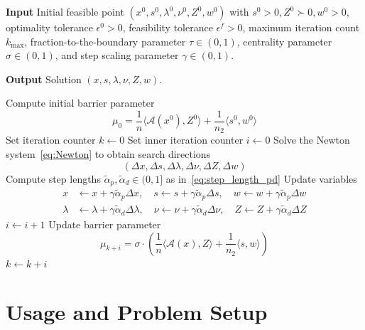 \documentclass[]{interact}
\theoremstyle{plain}%
\theoremstyle{definition}
\theoremstyle{remark}
\begin{document}
\begin{algorithm}[h]
\caption{Outline of the Primal-Dual interior point Method}
\label{algo:pdipm}
\textbf{Input} Initial feasible point \( (x^0, s^0, \lambda^0, \nu^0, Z^0, w^0) \) with \( s^0 > 0, Z^0 \succ 0, w^0 > 0 \), optimality tolerance \(\epsilon^0 > 0\), feasibility tolerance \(\epsilon^f > 0\), maximum iteration count \(k_{\max}\), fraction-to-the-boundary parameter \(\tau \in (0,1)\), centrality parameter \(\sigma \in (0,1)\), and step scaling parameter \(\gamma \in (0,1)\).

\textbf{Output} Solution \( (x, s, \lambda, \nu, Z, w) \).

\begin{algorithmic}[1]
\State Compute initial barrier parameter
\[
\mu_0 = \frac{1}{n} \langle \mathcal{A}(x^0), Z^0 \rangle + \frac{1}{n_2} \langle s^0, w^0 \rangle
\]
\State Set iteration counter \( k \gets 0 \)
    \State Set inner iteration counter \( i \gets 0 \)
        \State Solve the Newton system~\eqref{eq:Newton} to obtain search directions
        \[
        (\Delta x, \Delta s, \Delta \lambda, \Delta \nu, \Delta Z, \Delta w)
        \]
        \State Compute step lengths \( \tilde{\alpha}_p, \tilde{\alpha}_d \in (0,1] \) as in~\eqref{eq:step_length_pd}
        \State Update variables
        \begin{align*}
            x &\gets x + \gamma \tilde{\alpha}_p \Delta x, \quad s \gets s + \gamma \tilde{\alpha}_p \Delta s, \quad w \gets w + \gamma \tilde{\alpha}_p \Delta w \\[6pt]
            \lambda &\gets \lambda + \gamma \tilde{\alpha}_d \Delta \lambda, \quad \nu \gets \nu + \gamma \tilde{\alpha}_d \Delta \nu, \quad Z \gets Z + \gamma \tilde{\alpha}_d \Delta Z
        \end{align*}
        \State \( i \gets i + 1 \)
    \EndWhile
    \State Update barrier parameter
    \[
    \mu_{k+i} = \sigma \cdot \left( \frac{1}{n} \langle \mathcal{A}(x), Z \rangle + \frac{1}{n_2} \langle s, w \rangle \right)
    \]
    \State \( k \gets k + i \)
\EndWhile
\end{algorithmic}
\end{algorithm}

\section{Usage and Problem Setup}\label{sec:usage_prob}
\end{document}

